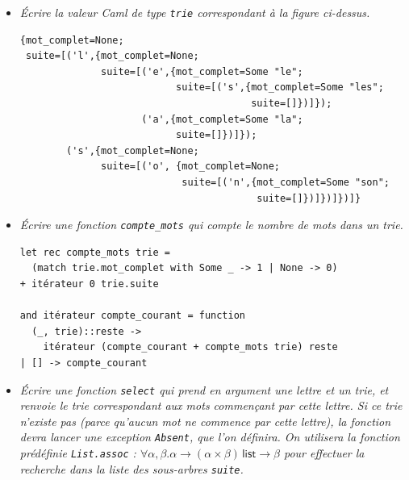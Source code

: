 \documentclass[11pt, a4paper]{article}
\begin{document}
\medskip

\begin{itemize}

  \item[\textbf{A.1}] \emph{Écrire la valeur Caml de type
       \texttt{trie} correspondant à la figure ci-dessus.}

       \smallskip

{\small
       \begin{verbatim}
{mot_complet=None;
 suite=[('l',{mot_complet=None;
              suite=[('e',{mot_complet=Some "le";
                           suite=[('s',{mot_complet=Some "les";
                                        suite=[]})]});
                     ('a',{mot_complet=Some "la";
                           suite=[]})]});
        ('s',{mot_complet=None;
              suite=[('o', {mot_complet=None;
                            suite=[('n',{mot_complet=Some "son";
                                         suite=[]})]})]})]}
       \end{verbatim}
}
       \smallskip

  \item[\textbf{A.2}] \emph{Écrire une fonction \texttt{compte\_mots}
       qui compte le nombre de mots dans un \emph{trie}.}

       \smallskip

\begin{verbatim}
let rec compte_mots trie =
  (match trie.mot_complet with Some _ -> 1 | None -> 0)
+ itérateur 0 trie.suite

and itérateur compte_courant = function
  (_, trie)::reste ->
    itérateur (compte_courant + compte_mots trie) reste
| [] -> compte_courant
\end{verbatim}

      \smallskip

  \item[\textbf{A.3}] \emph{Écrire une fonction \texttt{select} qui
       prend en argument une lettre et un \emph{trie}, et renvoie le
       \emph{trie} correspondant aux mots commençant par cette
       lettre. Si ce \emph{trie} n'existe pas (parce qu'aucun mot ne
       commence par cette lettre), la fonction devra lancer une
       exception {\tt Absent}, que l'on définira. On utilisera la
       fonction prédéfinie \texttt{List.assoc} : $\forall \alpha,
       \beta.\alpha \rightarrow (\alpha \times \beta) \, \textsf{list}
       \rightarrow \beta$ pour effectuer la recherche dans la liste
       des sous-arbres \texttt{suite}.}


\end{itemize}
\end{document}

